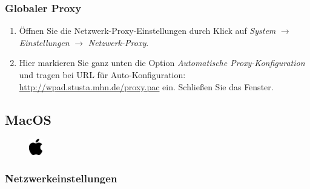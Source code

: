 \documentclass[a4paper,12pt]{scrartcl}
\begin{document}
\subsubsection*{Globaler Proxy}

\begin{enumerate}
	\item Öffnen Sie die Netzwerk-Proxy-Einstellungen durch Klick auf \emph{System} $\rightarrow$ \emph{Einstellungen} $\rightarrow$ \emph{Netzwerk-Proxy}.
	\item Hier markieren Sie ganz unten die Option \emph{Automatische Proxy-Konfiguration} und tragen bei URL für Auto-Konfiguration: \url{http://wpad.stusta.mhn.de/proxy.pac} ein. Schließen Sie das Fenster. 
\end{enumerate}

\pagebreak

\subsection{MacOS}

\begin{figure}[h]
	\raggedleft
	\vspace{-35pt}
	\includegraphics[height=0.7cm,keepaspectratio]{Bilder/apple_logo_neu}
	\vspace{-20pt}
\end{figure}

\subsubsection*{Netzwerkeinstellungen}
\end{document}
